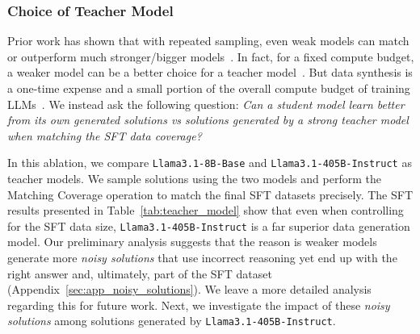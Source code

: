 \subsubsection{Choice of Teacher Model}
\label{sec:teacher_model}


Prior work has shown that with repeated sampling, even weak models can match or outperform much stronger/bigger models~\citep{li2024common7blanguagemodels, brown2024largelanguagemonkeysscaling}. 
In fact, for a fixed compute budget, a weaker model can be a better choice for a teacher model~\citep{bansal2024smallerweakerbettertraining}. 
But data synthesis is a one-time expense and a small portion of the overall compute budget of training LLMs~\citep{epoch2023tradingoffcomputeintrainingandinference}. 
We instead ask the following question: 
\emph{Can a student model learn better from its own generated solutions vs solutions generated by a strong teacher model when matching the SFT data coverage?}


In this ablation, we compare \texttt{Llama3.1-8B-Base} and \texttt{Llama3.1-405B-Instruct} as teacher models.  
We sample solutions using the two models and perform the Matching Coverage operation to match the final SFT datasets precisely. 
The SFT results presented in Table~\ref{tab:teacher_model}  show that even when controlling for the SFT data size, \texttt{Llama3.1-405B-Instruct} is a far superior data generation model. 
Our preliminary analysis suggests that the reason is weaker models generate more  \emph{noisy solutions} that use incorrect reasoning yet end up with the right answer and, ultimately, part of the SFT dataset (Appendix~\ref{sec:app_noisy_solutions}).  
We leave a more detailed analysis regarding this for future work.  
Next, we investigate the impact of these \emph{noisy solutions} among solutions generated by \texttt{Llama3.1-405B-Instruct}. 



